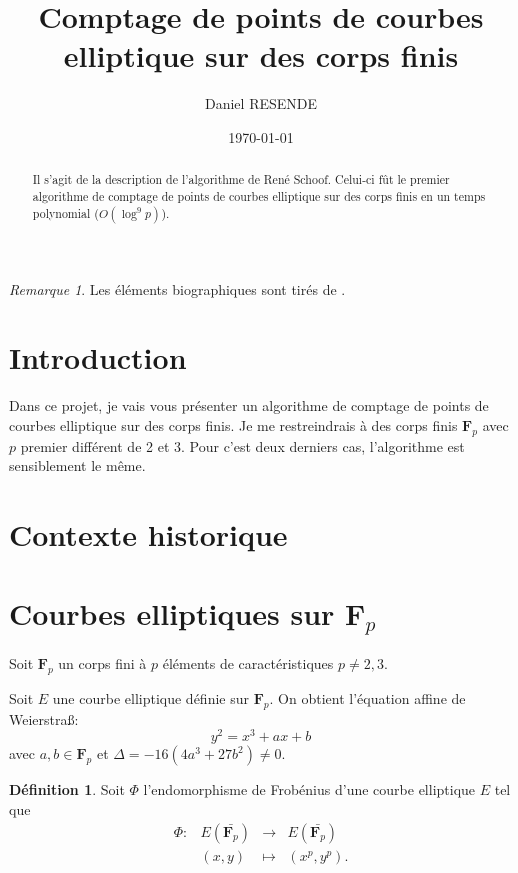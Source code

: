 \documentclass[fleqn,leqno]{article}%
\title{Comptage de points de courbes elliptique sur des corps finis}
\author{Daniel RESENDE}
\date{\today}
\theoremstyle{plain}
\theoremstyle{definition}
\newtheorem{definition}{Définition}[section]
\theoremstyle{remark}
\newtheorem*{remarque}{Remarque}
\numberwithin{equation}{section}
\begin{document}
\maketitle

\begin{abstract}
Il s'agit de la description de l'algorithme de René Schoof. Celui-ci fût le premier algorithme de comptage de points de courbes elliptique sur des corps finis en un temps polynomial ($O(\log^{9} p)$).  
\end{abstract}

\begin{remarque}
Les éléments biographiques sont tirés de \cite{Wikipedia.Euler}.
\end{remarque}

\tableofcontents

\clearpage{}
\section*{Introduction}

Dans ce projet, je vais vous présenter un algorithme de comptage de points de courbes elliptique sur des corps finis. Je me restreindrais à des corps finis $\mathbf{F}_{p}$ avec $p$ premier différent de 2 et 3. Pour c'est deux derniers cas, l'algorithme est sensiblement le même. 

\section{Contexte historique}



\section{Courbes elliptiques sur $\mathbf{F}_{p}$}
Soit $\mathbf{F}_{p}$ un corps fini à $p$ éléments de caractéristiques $p\neq 2,3$.

Soit $E$ une courbe elliptique définie sur $\mathbf{F}_{p}$. On obtient l'équation affine de Weierstra\ss : $$y^{2} = x^{3} + ax + b$$ avec $a,b\in\mathbf{F}_{p}$ et $\Delta = -16(4a^{3} + 27b^{2}) \neq 0$.

\begin{definition}
Soit $\varPhi$ l'endomorphisme de Frobénius d'une courbe elliptique $E$ tel que  
$$\begin{array}{clcl}
\varPhi : &E(\bar{\mathbf{F}_{p}}) &\longrightarrow &E(\bar{\mathbf{F}_{p}})\\
&(x, y) &\longmapsto	&(x^{p}, y^{p}).\\
\end{array}$$
\end{definition}
\end{document}
